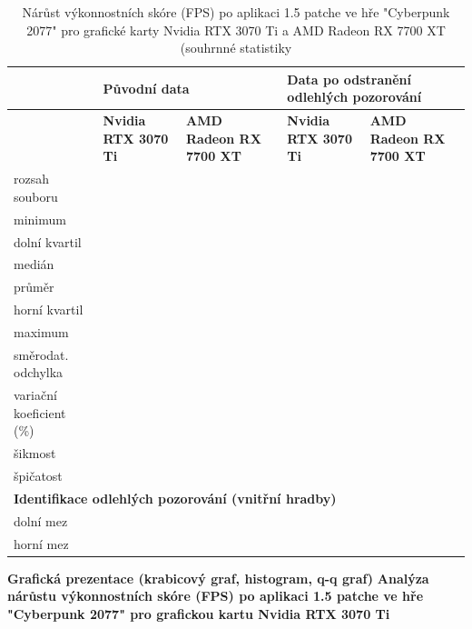 \documentclass[a4paper,12pt]{article}
\begin{document}
\begin{table}[h!]
    \renewcommand{\arraystretch}{1.3}
    \begin{tabular}{|p{3.5cm}|p{3cm}|p{3cm}|p{3cm}|p{3cm}|}
        \hline
        & \multicolumn{2}{p{6cm}|}{\centering \textbf{Původní data}} & \multicolumn{2}{p{6cm}|}{\centering \textbf{Data po odstranění odlehlých pozorování}} \\
        \hline
        & \centering \textbf{Nvidia RTX 3070 Ti} & \textbf{AMD Radeon RX 7700 XT} & \centering \textbf{Nvidia RTX 3070 Ti} & \textbf{AMD Radeon RX 7700 XT}\\
        \hline
        rozsah souboru & & & & \\
        \hline
        minimum & & & & \\
        \hline
        dolní kvartil & & & & \\
        \hline
        medián & & & & \\
        \hline
        průměr & & & & \\
        \hline
        horní kvartil & & & & \\
        \hline
        maximum & & & & \\
        \hline
        směrodat. odchylka & & & & \\
        \hline
        variační koeficient (\%) & & & & \\
        \hline
        šikmost & & & & \\
        \hline
        špičatost & & & & \\
        \hline
        \multicolumn{5}{|p{16cm}|}{\textbf{Identifikace odlehlých pozorování (vnitřní hradby)}} \\
        \hline
        dolní mez &  & &  & \\
        \hline
        horní mez &  & &  & \\
        \hline
    \end{tabular}
    \caption{Nárůst výkonnostních skóre (FPS) po aplikaci 1.5 patche ve hře "Cyberpunk 2077" pro grafické karty Nvidia RTX 3070 Ti a AMD Radeon RX 7700 XT (souhrnné statistiky}
\end{table}
\newpage
\textbf{Grafická prezentace (krabicový graf, histogram, q-q graf)}
\newpage
\textbf{Analýza nárůstu výkonnostních skóre (FPS) po aplikaci 1.5 patche ve hře "Cyberpunk 2077" pro grafickou kartu Nvidia RTX 3070 Ti}\\
\end{document}
